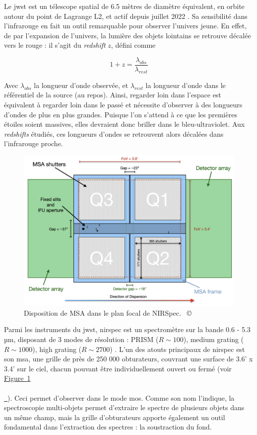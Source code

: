\documentclass[12pt, a4paper]{article}
\newcommand{\customcite}[1]{\mbox{
  {\small \copyright} \cite{#1}}
}
\newcommand*{\figref}[2][]{%
  \hyperref[{#2}]{%
    Figure~\ref*{#2}%
    \ifx\\#1\\%
    \else
      \,#1%
    \fi
  }%
}
\begin{document}
Le \gls{jwst} est un télescope spatial de 6.5 mètres de diamètre équivalent, en orbite autour du point de Lagrange L2, et actif depuis juillet 2022 . Sa sensibilité dans l'infrarouge en fait un outil remarquable pour observer l'univers jeune. En effet, de par l'expansion de l'univers, la lumière des objets lointains se retrouve décalée vers le rouge : il s'agit du \textit{redshift} $z$, défini comme 

\begin{equation}
    1 + z = \frac{\lambda_{obs}}{\lambda_{rest}}
\end{equation}

Avec $\lambda_{obs}$ la longueur d'onde observée, et $\lambda_{rest}$ la longueur d'onde dans le référentiel de la source (au repos). Ainsi, regarder loin dans l'espace est équivalent à regarder loin dans le passé et nécessite d'observer à des longueurs d'ondes de plus en plus grandes. Puisque l'on s'attend à ce que les premières étoiles soient massives, elles devraient donc briller dans le bleu-ultraviolet. Aux \textit{redshifts} étudiés, ces longueurs d'ondes se retrouvent alors décalées dans l'infrarouge proche.

\begin{figure}[!h]
  \centering
  \includegraphics[scale=0.4]{assets/msa_ds_new.png}
  \caption{Disposition de MSA dans le plan focal de NIRSpec. \customcite{2022A&A...661A..81F}}
  \label{fig:msa_shutter}
\end{figure}

Parmi les instruments du \gls{jwst}, \gls{nirspec} est un spectromètre sur la bande 0.6 - 5.3  µm, disposant de 3 modes de résolution : PRISM ($R \sim 100$), medium grating ($R \sim 1000$), high grating ($R \sim 2700$) . L'un des atouts principaux de \gls{nirspec} est son \gls{msa}, une grille de près de 250 000 obturateurs, couvrant une surface de 3.6' x 3.4' sur le ciel, chacun pouvant être individuellement ouvert ou fermé  (voir \figref{fig:msa_shutter}). Ceci permet d'observer dans le mode \gls{mos}. Comme son nom l'indique, la spectroscopie multi-objets permet d'extraire le spectre de plusieurs objets dans un même champ, mais la grille d'obturateurs apporte également un outil fondamental dans l'extraction des spectres : la soustraction du fond.\\
\end{document}
